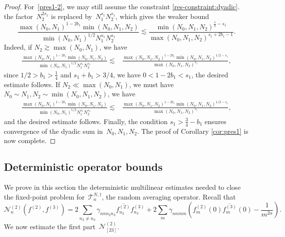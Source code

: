 \documentclass[11pt,reqno,english]{amsart}
\numberwithin{equation}{section}
\theoremstyle{plain}
\theoremstyle{definition}
\theoremstyle{remark}
\newcommand{\ov}{\overline}
\begin{document}
\begin{proof}
	For~\eqref{pres1-2}, we may still assume the constraint  \eqref{res-constraint:dyadic}.  the factor~$N_2^{2s_1}$ is replaced by~$N_1^{s_1}N_2^{s_1}$, which gives the weaker bound
	\[
	\frac{\max(N_0,N_1)^{1-2b_1}\min(N_0,N_1,N_2)}{\min(N_0,N_1)^{1/2}N_1^{s_1}N_2^{s_1}} \lesssim \frac{\min(N_0,N_1,N_2)^{\frac{1}{2}-s_1} }{\max(N_0,N_1,N_2)^{s_1+2b_1-1}}.
	\]
Indeed, if $N_2\gtrsim \max(N_0,N_1)$, we have
\begin{align*}
\frac{\max(N_0,N_1)^{1-2b_1}\min(N_0,N_1,N_2) }{\min(N_0,N_1)^{1/2}N_1^{s_1}N_2^{s_1} }\lesssim & \frac{\max(N_0,N_1,N_2)^{1-2b_1}\min(N_0,N_1,N_2)^{1/2-s_1} }{\max(N_0,N_1,N_2)^{s_1}},
\end{align*}
since $1/2>b_1>\frac{1}{4}$ and $s_1+b_1>3/4$, we have $0<1-2b_1<s_1$, the desired estimate follows.  If $N_2\ll \max(N_0,N_1)$, we must have $N_0\sim N_1, N_2\sim \min(N_0,N_1,N_2)$, we have
\begin{align*}
\frac{\max(N_0,N_1)^{1-2b_1}\min(N_0,N_1,N_2) }{\min(N_0,N_1)^{1/2}N_1^{s_1}N_2^{s_1}}\lesssim & \frac{\max(N_0,N_1,N_2)^{1-2b_1}\min(N_0,N_1,N_2)^{1/2-s_1} }{\max(N_0,N_1,N_2)^{s_1}},
\end{align*}
and the desired estimate follows.
Finally, the condition $s_1>\frac{3}{4}-b_1$ ensures convergence of the dyadic sum in~$N_0,N_1,N_2$. The proof of Corollary \ref{cor:pres1} is now complete. 
\end{proof}
	
	\subsection{Deterministic operator bounds}

We prove in this section the deterministic multilinear estimates needed to close the fixed-point problem for~$\mathcal{T}^{N,\dag}_{n}$, the random averaging operator. Recall that
\[
\mathcal{N}_n^{(2)}
\left(
f^{(2)},f^{(3)}
\right)=2\sum_{n_2\neq n_3}\gamma_{nnn_2n_3}\ov{f_{n_2}^{(2)}}f_{n_3}^{(3)}
+2\sum_{m}\gamma_{nnmm}
\left(
f_{m}^{(2)}(0)\ov{f_{m}^{(3)}}(0)-\frac{1}{m^{2\alpha}}
\right).
\]
We now estimate the first part~$\mathcal{N}_{[23]}^{(2)}$.
\end{document}
